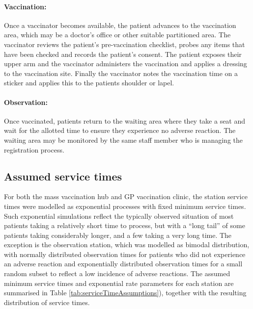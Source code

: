 \documentclass{article}
\begin{document}
\hypertarget{vaccination-1}{%
\paragraph{Vaccination:}\label{vaccination-1}}

Once a vaccinator becomes available, the patient advances to the
vaccination area, which may be a doctor's office or other suitable
partitioned area. The vaccinator reviews the patient's pre-vaccination
checklist, probes any items that have been checked and records the
patient's consent. The patient exposes their upper arm and the
vaccinator administers the vaccination and applies a dressing to the
vaccination site. Finally the vaccinator notes the vaccination time on a
sticker and applies this to the patients shoulder or lapel.

\hypertarget{observation-1}{%
\paragraph{Observation:}\label{observation-1}}

Once vaccinated, patients return to the waiting area where they take a
seat and wait for the allotted time to ensure they experience no adverse
reaction. The waiting area may be monitored by the same staff member who
is managing the registration process.

\hypertarget{assumed-service-times}{%
\subsection{Assumed service times}\label{assumed-service-times}}

For both the mass vaccination hub and GP vaccination clinic, the station
service times were modelled as exponential processes with fixed minimum
service times. Such exponential simulations reflect the typically
observed situation of most patients taking a relatively short time to
process, but with a ``long tail'' of some patients taking considerably
longer, and a few taking a very long time. The exception is the
observation station, which was modelled as bimodal distribution, with
normally distributed observation times for patients who did not
experience an adverse reaction and exponentially distributed observation
times for a small random subset to reflect a low incidence of adverse
reactions. The assumed minimum service times and exponential rate
parameters for each station are summarised in Table
\ref{tab:serviceTimeAssumptions}), together with the resulting
distribution of service times.
\end{document}
